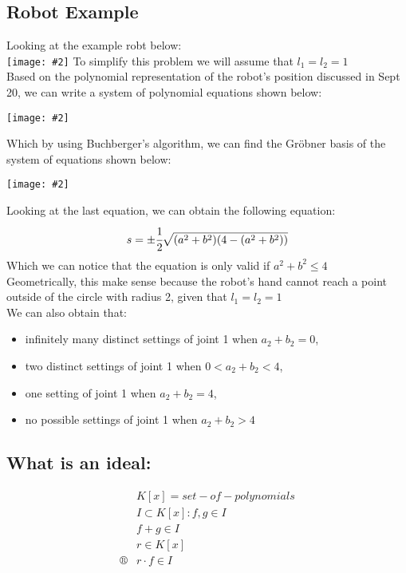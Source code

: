 \documentclass[11pt]{article}
\newcommand{\image}[2]{\texttt{[image: \#2]}}
\newcommand{\myalign}[1]{\begin{align*}#1\end{align*}}
\begin{document}
\subsection{Robot Example}
Looking at the example robt below: \\
\image{0.5}{img3}
To simplify this problem we will assume that $l_1 = l_2 = 1$ \\
Based on the polynomial representation of the robot's position discussed in Sept 20, we can write a system of polynomial equations shown below: \\
\begin{center}
    \image{0.5}{img4}
\end{center}
Which by using Buchberger's algorithm, we can find the Gröbner basis of the system of equations shown below: \\
\begin{center}
    \image{0.5}{img5}
\end{center}
Looking at the last equation, we can obtain the following equation: \\
\myalign{
    s = \pm \cfrac{1}{2}\sqrt{(a^2+b^2)(4-(a^2+b^2))}
}
Which we can notice that the equation is only valid if $a^2+b^2 \leq 4$ \\
Geometrically, this make sense because the robot's hand cannot reach a point outside of the circle with radius 2, given that $l_1 = l_2 = 1$ \\
We can also obtain that:
\begin{itemize}
    \item infinitely many distinct settings of joint 1 when $a_2 + b_2 = 0$,
    \item two distinct settings of joint 1 when $0<a_2 +b_2 <4$,
    \item one setting of joint 1 when $a_2 +b_2 =4$,
    \item no possible settings of joint 1 when $a_2 + b_2 > 4$
\end{itemize}

\subsection{What is an ideal:}
\myalign{
    & K[x] = set-of-polynomials \\
    & I \subset K[x]: f, g \in I \\
    & f + g \in I \\
    & r \in K[x] \\®
    & r \cdot f \in I \\
}
\end{document}
